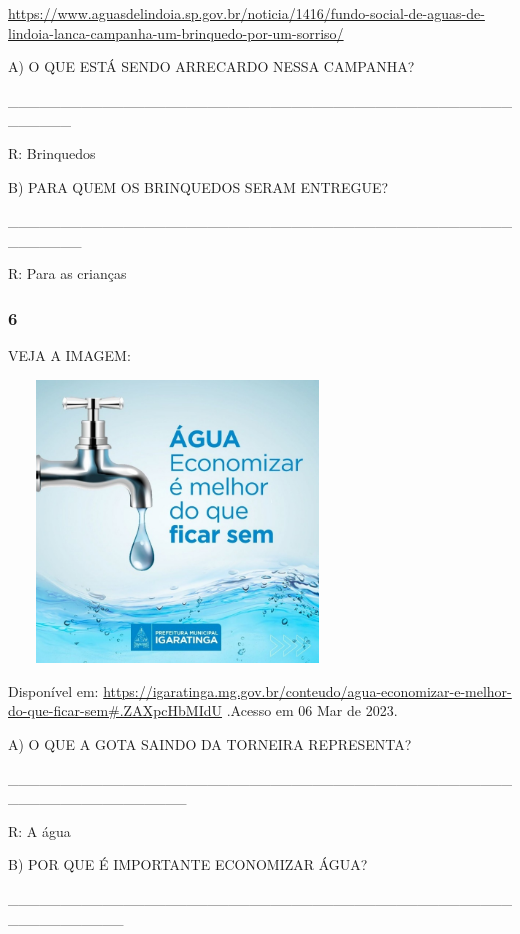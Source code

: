 \url{https://www.aguasdelindoia.sp.gov.br/noticia/1416/fundo-social-de-aguas-de-lindoia-lanca-campanha-um-brinquedo-por-um-sorriso/}

A) O QUE ESTÁ SENDO ARRECARDO NESSA CAMPANHA?

\_\_\_\_\_\_\_\_\_\_\_\_\_\_\_\_\_\_\_\_\_\_\_\_\_\_\_\_\_\_\_\_\_\_\_\_\_\_\_\_\_\_\_\_\_\_\_\_\_\_\_\_\_\_

R: Brinquedos

B) PARA QUEM OS BRINQUEDOS SERAM ENTREGUE?

\_\_\_\_\_\_\_\_\_\_\_\_\_\_\_\_\_\_\_\_\_\_\_\_\_\_\_\_\_\_\_\_\_\_\_\_\_\_\_\_\_\_\_\_\_\_\_\_\_\_\_\_\_\_\_

R: Para as crianças

\subsubsection{6}\label{section-86}

VEJA A IMAGEM:

\includegraphics[width=3.52778in,height=2.95347in]{media/image133.jpeg}

Disponível em:
\url{https://igaratinga.mg.gov.br/conteudo/agua-economizar-e-melhor-do-que-ficar-sem\#.ZAXpcHbMIdU}
.Acesso em 06 Mar de 2023.

A) O QUE A GOTA SAINDO DA TORNEIRA REPRESENTA?

\_\_\_\_\_\_\_\_\_\_\_\_\_\_\_\_\_\_\_\_\_\_\_\_\_\_\_\_\_\_\_\_\_\_\_\_\_\_\_\_\_\_\_\_\_\_\_\_\_\_\_\_\_\_\_\_\_\_\_\_\_\_\_\_\_

R: A água

B) POR QUE É IMPORTANTE ECONOMIZAR ÁGUA?

\_\_\_\_\_\_\_\_\_\_\_\_\_\_\_\_\_\_\_\_\_\_\_\_\_\_\_\_\_\_\_\_\_\_\_\_\_\_\_\_\_\_\_\_\_\_\_\_\_\_\_\_\_\_\_\_\_\_\_

